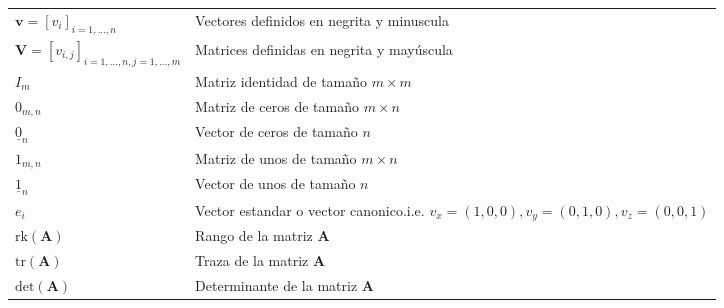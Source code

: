 \begin{table}[ht!]
\begin{center}
\begin{tabularx}{\textwidth}{|l|X|}
            \hline %
            $ \mathbf{v} = [v_{i}]_{i=1,...,n} $              & Vectores definidos en negrita y minuscula                                                                                   \\
            $ \mathbf{V} = [v_{i,j}]_{i=1,...,n, j=1,...,m} $ & Matrices definidas en negrita y mayúscula                                                                                   \\
            $ I_{m} $                                         & Matriz identidad de tamaño $ m \times m $                                                                                   \\
            $ 0_{m,n} $                                       & Matriz de ceros de tamaño $ m \times n $                                                                                    \\
            $ \underline{0}_{n} $                             & Vector de ceros de tamaño $n $                                                                                              \\
            $ 1_{m,n} $                                       & Matriz de unos de tamaño $ m \times n $                                                                                     \\
            $ \underline{1}_{n} $                             & Vector de unos de tamaño $n $                                                                                               \\
            $ e_{i} $                                         & Vector estandar o vector canonico.\newline i.e. $\scriptstyle{ v_{x} = (1,0,0), v_{y} = (0,1,0), v_{z} = (0,0,1)} $         \\
            $ \text{rk}\left(\mathbf{A}\right) $              & Rango de la matriz $\mathbf{A}$                                                                                             \\
            $ \text{tr}\left(\mathbf{A}\right) $              & Traza de la matriz $\mathbf{A}$                                                                                             \\
            $ \text{det}\left(\mathbf{A}\right) $             & Determinante de la matriz $\mathbf{A}$                                                                                      \\

\end{tabularx}
\end{center}
\end{table}
